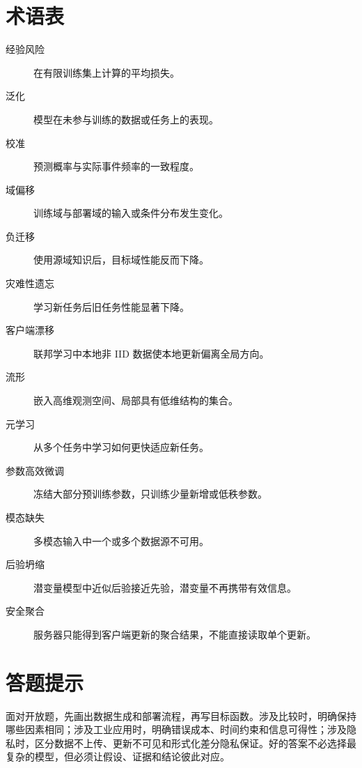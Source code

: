 \section{术语表}
\begin{description}
 \item[经验风险] 在有限训练集上计算的平均损失。
 \item[泛化] 模型在未参与训练的数据或任务上的表现。
 \item[校准] 预测概率与实际事件频率的一致程度。
 \item[域偏移] 训练域与部署域的输入或条件分布发生变化。
 \item[负迁移] 使用源域知识后，目标域性能反而下降。
 \item[灾难性遗忘] 学习新任务后旧任务性能显著下降。
 \item[客户端漂移] 联邦学习中本地非 IID 数据使本地更新偏离全局方向。
 \item[流形] 嵌入高维观测空间、局部具有低维结构的集合。
 \item[元学习] 从多个任务中学习如何更快适应新任务。
 \item[参数高效微调] 冻结大部分预训练参数，只训练少量新增或低秩参数。
 \item[模态缺失] 多模态输入中一个或多个数据源不可用。
 \item[后验坍缩] 潜变量模型中近似后验接近先验，潜变量不再携带有效信息。
 \item[安全聚合] 服务器只能得到客户端更新的聚合结果，不能直接读取单个更新。
\end{description}

\section{答题提示}
面对开放题，先画出数据生成和部署流程，再写目标函数。涉及比较时，明确保持哪些因素相同；涉及工业应用时，明确错误成本、时间约束和信息可得性；涉及隐私时，区分数据不上传、更新不可见和形式化差分隐私保证。好的答案不必选择最复杂的模型，但必须让假设、证据和结论彼此对应。